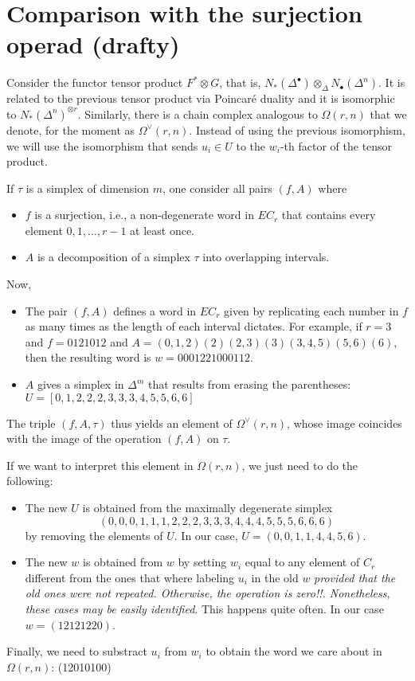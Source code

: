 	\section{Comparison with the surjection operad (drafty)}
	Consider the functor tensor product $F^*\otimes G$, that is, $N_*(\Delta^\bullet)\otimes_\Delta N_\bullet(\Delta^n)$. It is related to the previous tensor product via Poincaré duality and it is isomorphic to $N_*(\Delta^n)^{\otimes r}$. Similarly, there is a chain complex analogous to $\Omega(r,n)$ that we denote, for the moment as $\Omega^\vee(r,n)$. Instead of using the previous isomorphism, we will use the isomorphism that sends $u_i\in U$ to the $w_i$-th factor of the tensor product.

	If $\tau$ is a simplex of dimension $m$, one consider all pairs $(f,A)$ where
	\begin{itemize}
		\item $f$ is a surjection, i.e., a non-degenerate word in $EC_r$ that contains every element $0,1,\ldots,r-1$ at least once.
		\item $A$ is a decomposition of a simplex $\tau$ into overlapping intervals.
	\end{itemize}
	Now,
	\begin{itemize}
		\item The pair $(f,A)$ defines a word in $EC_r$ given by replicating each number in $f$ as many times as the length of each interval dictates. For example, if $r=3$ and $f= 0121012$ and $A=(0,1,2)(2)(2,3)(3)(3,4,5)(5,6)(6)$, then the resulting word is $w=0001221000112$.
		\item $A$ gives a simplex in $\Delta^m$ that results from erasing the parentheses: $U=[0,1,2,2,2,3,3,3,4,5,5,6,6]$
	\end{itemize}
	The triple $(f,A,\tau)$ thus yields an element of $\Omega^\vee(r,n)$, whose image coincides with the image of the operation $(f,A)$ on $\tau$.

	If we want to interpret this element in $\Omega(r,n)$, we just need to do the following:
	\begin{itemize}
		\item The new $U$ is obtained from the maximally degenerate simplex \[(0,0,0,1,1,1,2,2,2,3,3,3,4,4,4,5,5,5,6,6,6)\] by removing the elements of $U$. In our case, $U=(0,0,1,1,4,4,5,6)$.
		\item The new $w$ is obtained from $w$ by setting $w_i$ equal to any element of $C_r$ different from the ones that where labeling $u_i$ in the old $w$ \emph{provided that the old ones were not repeated. Otherwise, the operation is zero!!. Nonetheless, these cases may be easily identified}. This happens quite often. In our case $w=(12121220)$.
	\end{itemize}
	Finally, we need to substract $u_i$ from $w_i$ to obtain the word we care about in $\Omega(r,n)$: (12010100)

